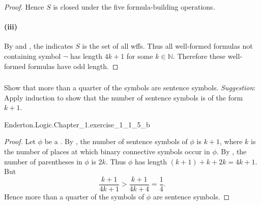 \documentclass{report}
\begin{document}
\begin{proof}
      Hence $S$ is closed under the five formula-building operations.

    \paragraph{(iii)}%

      By  and ,
        the  indicates $S$ is the set of all
        wffs.
      Thus all well-formed formulas not containing symbol $\neg$ has length
        $4k + 1$ for some $k \in \mathbb{N}$.
      Therefore these well-formed formulas have odd length.

  \end{proof}

\subsubsection{}%

  Show that more than a quarter of the symbols are sentence symbols.
  \textit{Suggestion}: Apply induction to show that the number of sentence
    symbols is of the form $k + 1$.

    {Enderton.Logic.Chapter\_1.exercise\_1\_1\_5\_b}

  \begin{proof}

    Let $\phi$ be a .
    By , the number of sentence symbols of $\phi$ is
      $k + 1$, where $k$ is the number of places at which binary connective
      symbols occur in $\phi$.
    By , the number of parentheses in $\phi$ is
      $2k$.
    Thus $\phi$ has length $(k + 1) + k + 2k = 4k + 1$.
    But $$\frac{k + 1}{4k + 1} > \frac{k + 1}{4k + 4} = \frac{1}{4}.$$
    Hence more than a quarter of the symbols of $\phi$ are sentence symbols.

  \end{proof}
\end{document}
